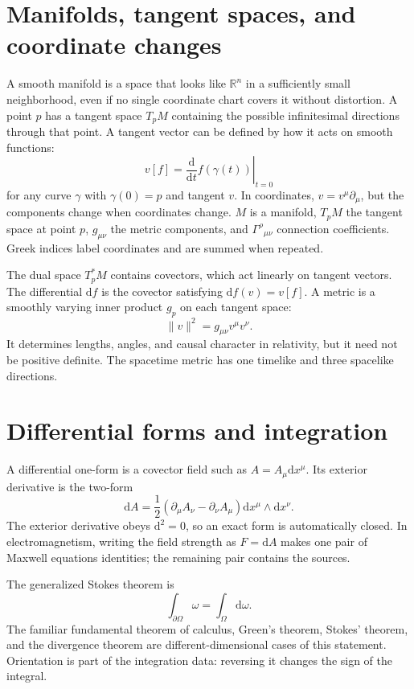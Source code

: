 \documentclass[11pt,oneside]{book}
\newcommand{\dd}{\mathrm{d}}
\theoremstyle{reviewstyle}
\begin{document}
\section{Manifolds, tangent spaces, and coordinate changes}
A smooth manifold is a space that looks like $\mathbb R^n$ in a sufficiently small neighborhood, even if no single coordinate chart covers it without distortion. A point $p$ has a tangent space $T_pM$ containing the possible infinitesimal directions through that point. A tangent vector can be defined by how it acts on smooth functions:
\begin{equation}
v[f]=\left.\frac{\dd}{\dd t}f(\gamma(t))\right|_{t=0}
\end{equation}
for any curve $\gamma$ with $\gamma(0)=p$ and tangent $v$. In coordinates, $v=v^\mu\partial_\mu$, but the components change when coordinates change. $M$ is a manifold, $T_pM$ the tangent space at point $p$, $g_{\mu\nu}$ the metric components, and $\Gamma^\rho{}_{\mu\nu}$ connection coefficients. Greek indices label coordinates and are summed when repeated.

The dual space $T_p^*M$ contains covectors, which act linearly on tangent vectors. The differential $\dd f$ is the covector satisfying $\dd f(v)=v[f]$. A metric is a smoothly varying inner product $g_p$ on each tangent space:
\begin{equation}
\lVert v\rVert^2=g_{\mu\nu}v^\mu v^\nu.
\end{equation}
It determines lengths, angles, and causal character in relativity, but it need not be positive definite. The spacetime metric has one timelike and three spacelike directions.

\section{Differential forms and integration}
A differential one-form is a covector field such as $A=A_\mu\dd x^\mu$. Its exterior derivative is the two-form
\begin{equation}
\dd A=\frac12(\partial_\mu A_\nu-\partial_\nu A_\mu)\dd x^\mu\wedge\dd x^\nu.
\end{equation}
The exterior derivative obeys $\dd^2=0$, so an exact form is automatically closed. In electromagnetism, writing the field strength as $F=\dd A$ makes one pair of Maxwell equations identities; the remaining pair contains the sources.

The generalized Stokes theorem is
\begin{equation}
\int_{\partial \Omega}\omega=\int_\Omega\dd\omega.
\end{equation}
The familiar fundamental theorem of calculus, Green's theorem, Stokes' theorem, and the divergence theorem are different-dimensional cases of this statement. Orientation is part of the integration data: reversing it changes the sign of the integral.
\end{document}
